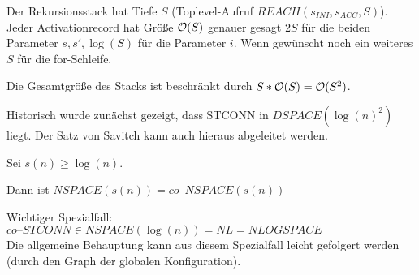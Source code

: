 Der Rekursionsstack hat Tiefe $S$ (Toplevel-Aufruf $REACH(s_{INI}, s_{ACC}, S)$).
\\
Jeder Activationrecord hat Größe $\mathcal{O}(S)$ genauer gesagt $2 S$ für die beiden Parameter $s, s', \log(S)$ für die Parameter $i$. Wenn gewünscht noch ein weiteres $S$ für die for-Schleife.


Die Gesamtgröße des Stacks ist beschränkt durch $S * \mathcal{O}(S) = \mathcal{O}(S^2)$.


Historisch wurde zunächst gezeigt, dass STCONN in $DSPACE(\log(n)^2)$ liegt. Der Satz von Savitch kann auch hieraus abgeleitet werden.













\begin{satz}


    Sei $s(n) \geq \log(n)$.

    Dann ist $NSPACE(s(n)) = co\text{--}NSPACE(s(n))$

    Wichtiger Spezialfall: $co\text{--}STCONN \in NSPACE(\log(n)) = NL = NLOGSPACE$
    \\
    Die allgemeine Behauptung kann aus diesem Spezialfall leicht gefolgert werden (durch den Graph der globalen Konfiguration).


\end{satz}


